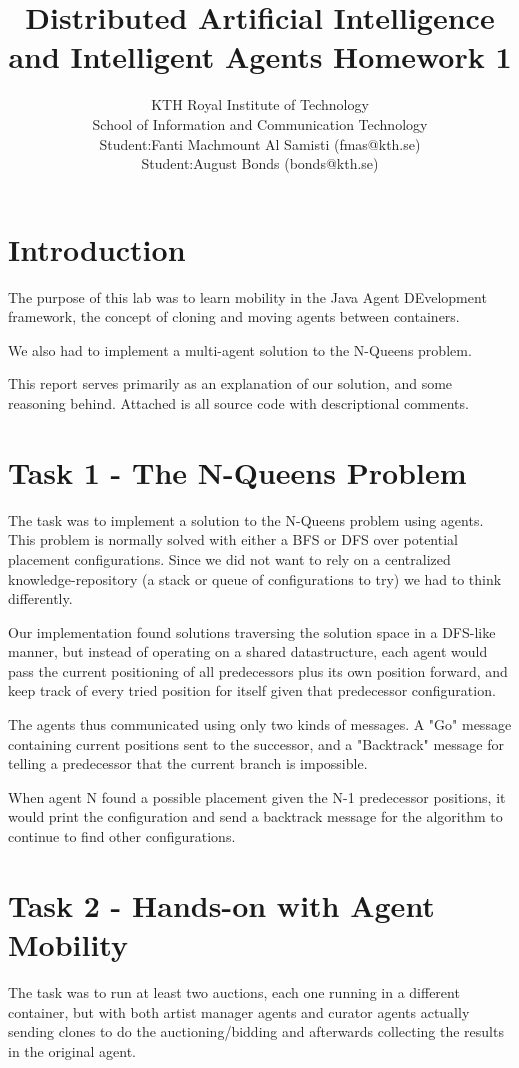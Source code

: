 \documentclass[a4paper, 11pt]{article}
\title{\textbf{Distributed Artificial Intelligence and Intelligent Agents Homework 1}}
\author{KTH Royal Institute of Technology \\ 
		School of Information and Communication Technology \\
		Student:Fanti Machmount Al Samisti (fmas@kth.se) \\
		Student:August Bonds (bonds@kth.se)}
\begin{document}
	
\maketitle

\section{Introduction}

The purpose of this lab was to learn mobility in the Java Agent DEvelopment framework, the concept of cloning and moving agents between containers.

We also had to implement a multi-agent solution to the N-Queens problem.

This report serves primarily as an explanation of our solution, and some reasoning behind. Attached is all source code with descriptional comments.

\section{Task 1 - The N-Queens Problem}
The task was to implement a solution to the N-Queens problem using agents. This problem is normally solved with either a BFS or DFS over potential placement configurations. Since we did not want to rely on a centralized knowledge-repository (a stack or queue of configurations to try) we had to think differently.

Our implementation found solutions traversing the solution space in a DFS-like manner, but instead of operating on a shared datastructure, each agent would pass the current positioning of all predecessors plus its own position forward, and keep track of every tried position for itself given that predecessor configuration.

The agents thus communicated using only two kinds of messages. A "Go" message containing current positions sent to the successor, and a "Backtrack" message for telling a predecessor that the current branch is impossible.

When agent N found a possible placement given the N-1 predecessor positions, it would print the configuration and send a backtrack message for the algorithm to continue to find other configurations.
\section{Task 2 - Hands-on with Agent Mobility}

The task was to run at least two auctions, each one running in a different container, but with both artist manager agents and curator agents actually sending clones to do the auctioning/bidding and afterwards collecting the results in the original agent.
\end{document}
